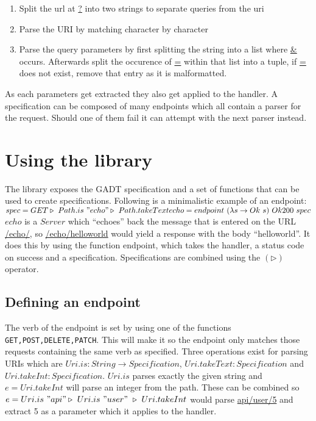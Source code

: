 \begin{enumerate}
    \item Split the url at \url{?} into two strings to separate queries from the 
        uri
    \item Parse the URI by matching character by character
    \item Parse the query parameters by first splitting the string into a list
        where \url{&} occurs. Afterwards split the occurence of \url{=} within
        that list into a tuple, if \url{=} does not exist, remove that entry as
        it is malformatted.
\end{enumerate}

As each parameters get extracted they also get applied to the handler. A
specification can be composed of many endpoints which all contain a parser for
the request. Should one of them fail it can attempt with the next parser
instead.

\section{Using the library}

The library exposes the GADT specification and a set of functions that can be
used to create specifications. Following is a minimalistic example of an
endpoint:\\

\noindent
\begin{math}
spec = GET \triangleright\ Path.is\ "echo" \triangleright\ Path.takeText\\
echo = endpoint\ (\lambda s \rightarrow Ok\ s)\ Ok200\ spec
\end{math}\\

$echo$ is a $Server$ which ``echoes'' back the message that is entered on the
URL \url{/echo/}, so \url{/echo/helloworld} would yield a response with the body
``helloworld''. It does this by using the function endpoint, which takes the
handler, a status code on success and a specification.  Specifications are
combined using the $(\triangleright )$ operator.

\subsection{Defining an endpoint}

The verb of the endpoint is set by using one of the functions
\texttt{GET,POST,DELETE,PATCH}. This will make it so the endpoint only matches
those requests containing the same verb as specified.  Three operations exist
for parsing URIs which are $Uri.is : String \rightarrow Specification$,
$Uri.takeText : Specification$ and $Uri.takeInt: Specification$. $Uri.is$ parses
exactly the given string and $e = Uri.takeInt$ will parse an integer from the
path.  These can be combined so $e = Uri.is\ "api" \triangleright\ Uri.is\
"user"\ \triangleright\ Uri.takeInt$ would parse \url{api/user/5} and extract 5
as a parameter which it applies to the handler.

